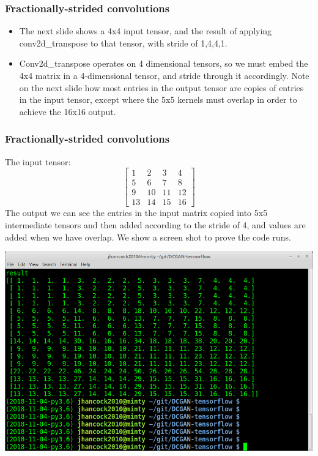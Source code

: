 \documentclass{beamer}
\begin{document}

\begin{frame}[allowframebreaks]
\frametitle{Fractionally-strided convolutions}
\begin{itemize}

\item The next slide shows  a 4x4  input tensor, and the result of applying 
conv2d\_transpose to that tensor, with stride of 1,4,4,1. 

\item Conv2d\_transpose operates on 4 dimensional tensors, so we must embed the  4x4
matrix in a 4-dimensional tensor, and stride through it accordingly. Note on the 
next slide how most entries in the output tensor are copies of entries in the input
tensor, except where the 5x5 kernels must overlap in order to achieve the 
16x16 output.
\end{itemize}
\end{frame}


\begin{frame}[allowframebreaks]
\frametitle{Fractionally-strided convolutions}
The input tensor:
\[
\begin{bmatrix}
  1 & 2 & 3 & 4 \\
  5 & 6 & 7 & 8 \\ 
  9 & 10 & 11 & 12 \\
  13 & 14 & 15 & 16
\end{bmatrix}
\]
The output we can see the entries in the input matrix copied into 5x5 intermediate
tensors and then added according to the stride of 4, and values are added when
we have overlap.  We show a screen shot to prove the code runs.

\includegraphics[scale=0.25]{conv2d-result}

\end{frame}
\end{document}
